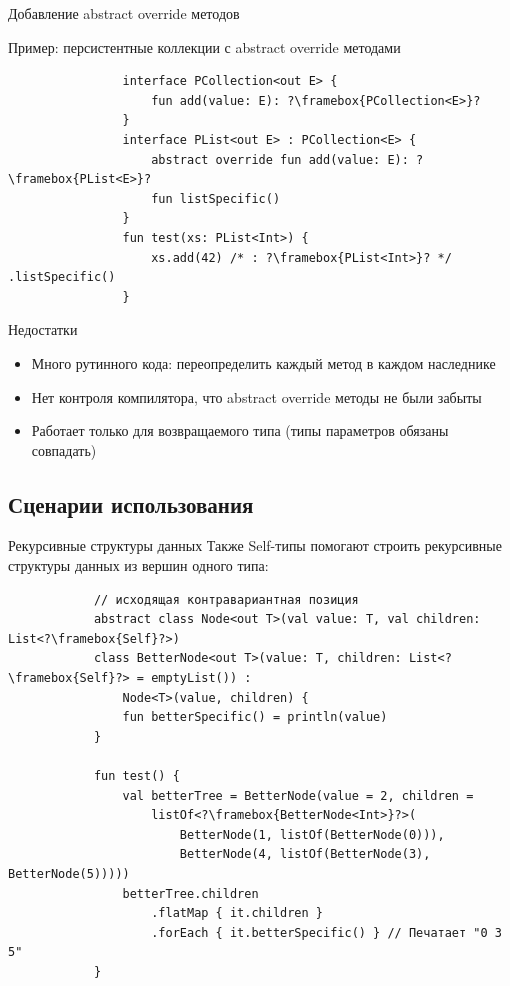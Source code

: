 \documentclass[usenames, dvipsnames]{beamer}
\begin{document}
    \begin{frame}[fragile]{Добавление abstract override методов}
        \begin{block}{Пример: персистентные коллекции с abstract override методами}
            \begin{verbatim}
                interface PCollection<out E> {
                    fun add(value: E): ?\framebox{PCollection<E>}?
                }
                interface PList<out E> : PCollection<E> {
                    abstract override fun add(value: E): ?\framebox{PList<E>}?
                    fun listSpecific()
                }
                fun test(xs: PList<Int>) {
                    xs.add(42) /* : ?\framebox{PList<Int>}? */ .listSpecific()
                }
            \end{verbatim}
        \end{block}

        \begin{block}{Недостатки}
            \begin{itemize}
                \item Много рутинного кода: переопределить каждый метод в каждом наследнике
                \item Нет контроля компилятора, что abstract override методы не были забыты
                \item Работает только для возвращаемого типа (типы параметров обязаны совпадать)
            \end{itemize}
        \end{block}
    \end{frame}


    \subsection{Сценарии использования}

    \begin{frame}[fragile]{Рекурсивные структуры данных}
        Также Self-типы помогают строить рекурсивные структуры данных из вершин одного типа:
        \begin{verbatim}
            // исходящая контравариантная позиция
            abstract class Node<out T>(val value: T, val children: List<?\framebox{Self}?>)
            class BetterNode<out T>(value: T, children: List<?\framebox{Self}?> = emptyList()) :
                Node<T>(value, children) {
                fun betterSpecific() = println(value)
            }

            fun test() {
                val betterTree = BetterNode(value = 2, children =
                    listOf<?\framebox{BetterNode<Int>}?>(
                        BetterNode(1, listOf(BetterNode(0))),
                        BetterNode(4, listOf(BetterNode(3), BetterNode(5)))))
                betterTree.children
                    .flatMap { it.children }
                    .forEach { it.betterSpecific() } // Печатает "0 3 5"
            }
        \end{verbatim}
    \end{frame}
\end{document}

